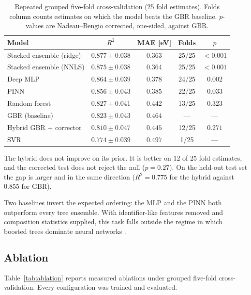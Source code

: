 \documentclass[journal]{IEEEtran}
\begin{document}
\begin{table}[t]
\centering
\caption{Repeated grouped five-fold cross-validation (25 fold estimates).
Folds column counts estimates on which the model beats the GBR baseline.
$p$-values are Nadeau--Bengio corrected, one-sided, against GBR.}
\label{tab:main}
\begin{tabular}{lcccc}
\toprule
Model & $R^2$ & MAE [eV] & Folds & $p$ \\
\midrule
Stacked ensemble (ridge) & $\mathbf{0.877 \pm 0.038}$ & $\mathbf{0.363}$ & 25/25 & $<0.001$ \\
Stacked ensemble (NNLS)  & $0.875 \pm 0.038$ & $0.364$ & 25/25 & $<0.001$ \\
Deep MLP                 & $0.864 \pm 0.039$ & $0.378$ & 24/25 & $0.002$ \\
PINN                     & $0.856 \pm 0.043$ & $0.385$ & 22/25 & $0.033$ \\
Random forest            & $0.827 \pm 0.041$ & $0.442$ & 13/25 & $0.323$ \\
GBR (baseline)           & $0.823 \pm 0.043$ & $0.464$ & ---   & ---    \\
Hybrid GBR + corrector   & $0.810 \pm 0.047$ & $0.445$ & 12/25 & $0.271$ \\
SVR                      & $0.774 \pm 0.039$ & $0.497$ &  1/25 & --- \\
\bottomrule
\end{tabular}
\end{table}

The hybrid does not improve on its prior. It is better on 12 of 25 fold
estimates, and the corrected test does not reject the null ($p = 0.27$). On the
held-out test set the gap is larger and in the same direction
($R^2 = 0.775$ for the hybrid against $0.855$ for GBR).

Two baselines invert the expected ordering: the MLP and the PINN both outperform
every tree ensemble. With identifier-like features removed and composition
statistics supplied, this task falls outside the regime in which boosted trees
dominate neural networks \cite{mcelfresh2023when}.

\subsection{Ablation}
Table~\ref{tab:ablation} reports measured ablations under grouped five-fold
cross-validation. Every configuration was trained and evaluated.
\end{document}
